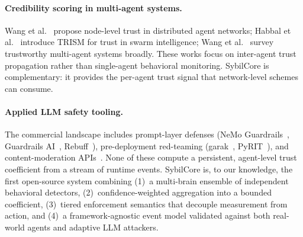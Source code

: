\documentclass{article}
\begin{document}
\paragraph{Credibility scoring in multi-agent systems.}
Wang et al.~\cite{wang2025node} propose node-level trust in
distributed agent networks; Habbal et al.~\cite{habbal2025trism}
introduce TRISM for trust in swarm intelligence; Wang et
al.~\cite{wang2025trustworthy} survey trustworthy multi-agent
systems broadly. These works focus on inter-agent trust propagation
rather than single-agent behavioral monitoring. SybilCore is
complementary: it provides the per-agent trust signal that
network-level schemes can consume.

\paragraph{Applied LLM safety tooling.}
The commercial landscape includes prompt-layer defenses (NeMo
Guardrails~\cite{nemo2023}, Guardrails AI~\cite{guardrails2023},
Rebuff~\cite{rebuff2023}), pre-deployment red-teaming
(garak~\cite{garak2024}, PyRIT~\cite{pyrit2024}), and
content-moderation APIs~\cite{openai2025guardrails}. None of these
compute a persistent, agent-level trust coefficient from a stream of
runtime events. SybilCore is, to our knowledge, the first open-source
system combining (1)~a multi-brain ensemble of independent behavioral
detectors, (2)~confidence-weighted aggregation into a bounded
coefficient, (3)~tiered enforcement semantics that decouple
measurement from action, and (4)~a framework-agnostic event model
validated against both real-world agents and adaptive LLM attackers.
\end{document}
